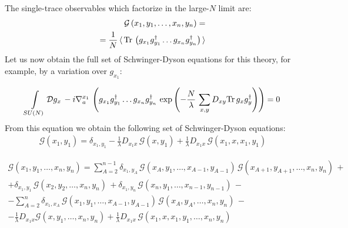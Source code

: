 \documentclass[twocolumn,showpacs,preprintnumbers,superscriptaddress,amsmath,floatfix,amssymb,secnumarabic]{revtex4}
\newcommand{\lr}[1]{ \left( #1 \right) }
\newcommand{\vev}[1]{ \langle \, #1 \, \rangle }
\newcommand{\tr}{ {\rm Tr} \, }
\newcommand{\expa}[1]{ \exp{\left( #1 \right)} }
\begin{document}
The single-trace observables which factorize in the large-$N$ limit are:
\begin{eqnarray}
\label{gf_def}
\mathcal{G}\lr{x_1, y_1, \ldots, x_n, y_n}
= \nonumber \\ =
\frac{1}{N}\, \vev{ \tr\lr{
g_{x_1} g^{\dag}_{y_1} \ldots g_{x_n} g^{\dag}_{y_n}} }
\end{eqnarray}
Let us now obtain the full set of Schwinger-Dyson equations for this theory, for example, by a variation over $g_{x_1}$:
\begin{widetext}
\begin{eqnarray}
\label{SD_derivation1}
\int\limits_{SU\lr{N}} \mathcal{D} g_{x} \, -i \nabla_a^{x_1} \,
\lr{g_{x_1} g^{\dag}_{y_1} \ldots g_{x_n} g^{\dag}_{y_n} \, \expa{ -\frac{N}{\lambda}\, \sum \limits_{x,y} D_{xy} \tr g_x g^{\dag}_y} } = 0
\end{eqnarray}
From this equation we obtain the following set of Schwinger-Dyson equations:
\begin{eqnarray}
\label{SDs_n2}
\mathcal{G}\lr{x_1, y_1} =
\delta_{x_1, y_1}
 - %
\frac{1}{\lambda} D_{x_1 x} \, \mathcal{G}\lr{x, y_1}
 +
\frac{1}{\lambda} D_{x_1 x} \, \mathcal{G}\lr{x_1, x, x_1, y_1}
\end{eqnarray}

\begin{eqnarray}
\label{SDs}
\mathcal{G}\lr{x_1, y_1, \ldots, x_n, y_n}
= %
\sum\limits_{A=2}^{n-1} \delta_{x_1, y_A} \,
\mathcal{G}\lr{x_A, y_1, \ldots, x_{A-1}, y_{A-1}}\,
\mathcal{G}\lr{x_{A+1}, y_{A+1}, \ldots, x_n, y_n}\,
+ \nonumber \\ +
\delta_{x_1, y_1} \, \mathcal{G}\lr{x_2, y_2, \ldots, x_n, y_n}\,
+
\delta_{x_1, y_n} \, \mathcal{G}\lr{x_n, y_1, \ldots, x_{n-1}, y_{n-1}}\,
- \nonumber \\ -
\sum\limits_{A=2}^{n} \delta_{x_1, x_A} \,
 \mathcal{G}\lr{x_1, y_1, \ldots, x_{A-1}, y_{A-1}}\,
 \mathcal{G}\lr{x_A, y_A, \ldots, x_n, y_n}\,
- \nonumber \\ -
\frac{1}{\lambda} D_{x_1 x} \mathcal{G}\lr{x, y_1, \ldots, x_n, y_n}
+
\frac{1}{\lambda} D_{x_1 x} \, \mathcal{G}\lr{x_1, x, x_1, y_1, \ldots, x_n, y_n}
\end{eqnarray}


\end{widetext}
\end{document}
